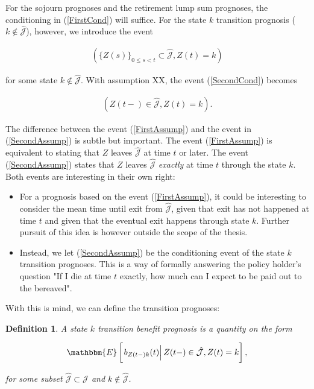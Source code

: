 \documentclass{book}
\newcommand{\1}[1]{\mathbbm{1}_{\left\lbrace #1 \right\rbrace}}
\newcommand{\econd}[2][def]{\mathbbm{E} \left[ \left. #1 \right| #2 \right]}
\theoremstyle{break}
\newtheorem{definition}{Definition}%
\theoremstyle{remark}
\numberwithin{equation}{section}
\begin{document}
For the sojourn prognoses and the retirement lump sum prognoses, the conditioning in (\ref{FirstCond}) will suffice. For the state $k$ transition prognosis ($k \notin \hat{\mathcal{J}}$), however, we introduce the event

\begin{align} \label{SecondCond}
	\left( \{ Z(s) \}_{0 \leq s < t} \subset \hat{\mathcal{J}} , Z(t) = k \right)
\end{align}

for some state $k \notin \hat{\mathcal{J}}$. With assumption XX, the event (\ref{SecondCond}) becomes

\begin{align} \label{SecondAssump}
	\left( Z(t-) \in \hat{\mathcal{J}} , Z(t) = k \right).
\end{align}

The difference between the event (\ref{FirstAssump}) and the event in (\ref{SecondAssump}) is subtle but important. The event (\ref{FirstAssump}) is equivalent to stating that $Z$ leaves $ \hat{\mathcal{J}}$ at time $t$ or later. The event (\ref{SecondAssump}) states that $Z$ leaves $\hat{\mathcal{J}}$ \textit{exactly} at time $t$ through the state $k$. Both events are interesting in their own right:

\begin{itemize}
	\item For a prognosis based on the event (\ref{FirstAssump}), it could be interesting to consider the mean time until exit from $\hat{\mathcal{J}}$, given that exit has not happened at time $t$ and given that the eventual exit happens through state $k$. Further pursuit of this idea is however outside the scope of the thesis.
	\item Instead, we let (\ref{SecondAssump}) be the conditioning event of the state $k$ transition prognoses. This is a way of formally answering the policy holder's question "If I die at time $t$ exactly, how much can I expect to be paid out to the bereaved".
\end{itemize}

With this is mind, we can define the transition prognoses:

\begin{definition}
	A state $k$ transition benefit prognosis is a quantity on the form
	
	\begin{gather*}
		\econd[b_{Z(t-)k}(t)]{Z(t-) \in \hat{\mathcal{J}}, Z(t)=k},
	\end{gather*}
	
	for some subset $\hat{\mathcal{J}} \subset \mathcal{J}$ and $k \notin \hat{\mathcal{J}}$.
\end{definition}
\end{document}
